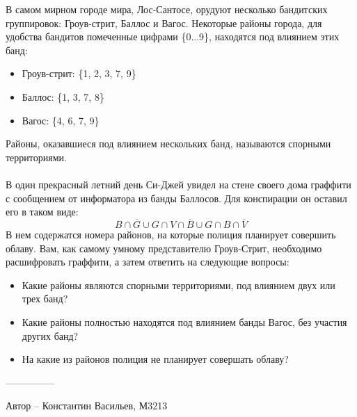 \question
В самом мирном городе мира, Лос-Сантосе, орудуют несколько бандитских группировок: Гроув-стрит, Баллос и Вагос. Некоторые районы города, для удобства бандитов помеченные цифрами \{0...9\}, находятся под влиянием этих банд:
\begin{itemize}
    \item Гроув-стрит: \{1, 2, 3, 7, 9\}
    \item Баллос: \{1, 3, 7, 8\}
    \item Вагос: \{4, 6, 7, 9\}
\end{itemize}
Районы, оказавшиеся под влиянием нескольких банд, называются спорными территориями.
\\
\\
В один прекрасный летний день Си-Джей увидел на стене своего дома граффити с сообщением от информатора из банды Баллосов. Для конспирации он оставил его в таком виде:
\begin{equation*}
B \cap \overline{G} \cup G \cap V \cap \overline{B} \cup G \cap B \cap \overline{V}
\end{equation*}
В нем содержатся номера районов, на которые полиция планирует совершить облаву. Вам, как самому умному представителю Гроув-Стрит, необходимо расшифровать граффити, а затем ответить на следующие вопросы:

\begin{itemize}
    \item Какие районы являются спорными территориями, под влиянием двух или трех банд?
    \item Какие районы полностью находятся под влиянием банды Вагос, без участия других банд?
    \item На какие из районов полиция не планирует совершать облаву?
\end{itemize}

---------------

Автор -- Константин Васильев, М3213